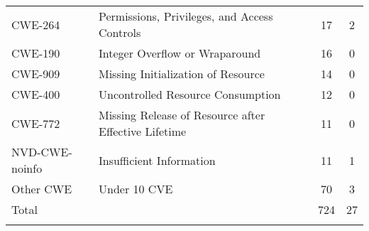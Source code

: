 \begin{table}[t]
{\begin{tabular}{llcc}
      CWE-264 	&Permissions, Privileges, and Access Controls	&17	&2\\
      CWE-190 	&Integer Overflow or Wraparound	&16	&0\\
      CWE-909 	&Missing Initialization of Resource	&14	&0\\
      CWE-400 	&Uncontrolled Resource Consumption	&12	&0\\
      CWE-772 	&Missing Release of Resource after Effective Lifetime	&11	&0\\
      NVD-CWE-noinfo 	&Insufficient Information	&11	&1\\
      \hline \noalign{\smallskip}
      Other CWE & Under 10 CVE & 70&3\\
      \hline \noalign{\smallskip}
      Total & & 724 & 27\\
      \hline \noalign{\smallskip}

    \end{tabular}
  }
    \label{tb:kernel_vulnerability_affection}
  \end{table}
  
